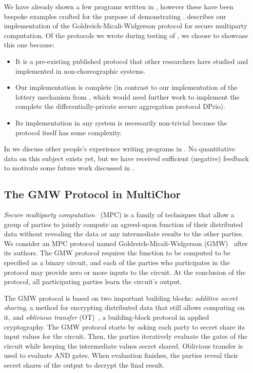We have already shown a few programs written in \MultiChor, however these have been bespoke examples crafted for the purpose of demonstrating \MultiChor.
 describes our implementation of the Goldreich-Micali-Widgerson protocol for secure multiparty computation.
Of the protocols we wrote during testing of \MultiChor, we choose to showcase this one because:
\begin{itemize}
	\item It is a pre-existing published protocol that other researchers have studied and implemented in non-choreographic systems.
	\item Our implementation is complete
		(in contrast to \eg our implementation of the lottery mechanism from \cite{dprio2023},
		 which would need further work to implement the complete the differentially-private secure aggregation protocol DPrio).
	\item Its implementation in any system is necessarily non-trivial because the protocol itself has some complexity.
\end{itemize}

In  we discuss other people's experience writing programs in \MultiChor.
No quantitative data on this subject exists yet,
but we have received sufficient (negative) feedback to motivate some future work discussed in .

\subsection{The GMW Protocol in MultiChor}
\label{sec:mpc}

\emph{Secure multiparty computation}~\cite{evans2018pragmatic} (MPC) is a family of techniques that allow a group of parties to jointly compute an agreed-upon function of their distributed data without revealing the data or any intermediate results to the other parties. We consider an MPC protocol named Goldreich-Micali-Widgerson (GMW)~\cite{goldreich2019play} after its authors. The GMW protocol requires the function to be computed to be specified as a binary circuit, and each of the parties who participates in the protocol may provide zero or more inputs to the circuit. At the conclusion of the protocol, all participating parties learn the circuit's output.

The GMW protocol is based on two important building blocks: \emph{additive secret sharing}, a method for encrypting distributed data that still allows computing on it, and \emph{oblivious transfer} (OT)~\cite{naor2001efficient}, a building-block protocol in applied cryptography. The GMW protocol starts by asking each party to secret share its input values for the circuit. Then, the parties iteratively evaluate the gates of the circuit while keeping the intermediate values secret shared. Oblivious transfer is used to evaluate AND gates. When evaluation finishes, the parties reveal their secret shares of the output to decrypt the final result.

